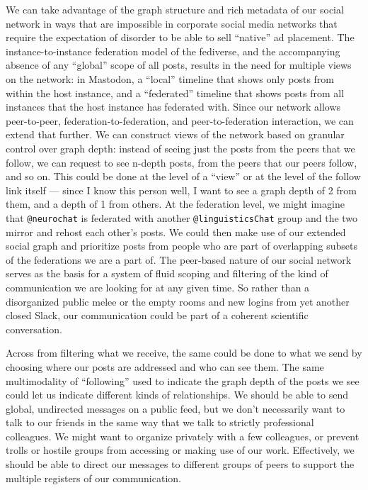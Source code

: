 We can take advantage of the graph structure and rich metadata of our
social network in ways that are impossible in corporate social media
networks that require the expectation of disorder to be able to sell
``native'' ad placement. The instance-to-instance federation model of
the fediverse, and the accompanying absence of any ``global'' scope of
all posts, results in the need for multiple views on the network: in
Mastodon, a ``local'' timeline that shows only posts from within the
host instance, and a ``federated'' timeline that shows posts from all
instances that the host instance has federated with. Since our network
allows peer-to-peer, federation-to-federation, and peer-to-federation
interaction, we can extend that further. We can construct views of the
network based on granular control over graph depth: instead of seeing
just the posts from the peers that we follow, we can request to see
n-depth posts, from the peers that our peers follow, and so on. This
could be done at the level of a ``view'' or at the level of the follow
link itself --- since I know this person well, I want to see a graph
depth of 2 from them, and a depth of 1 from others. At the federation
level, we might imagine that \texttt{@neurochat} is federated with
another \texttt{@linguisticsChat} group and the two mirror and rehost
each other's posts. We could then make use of our extended social graph
and prioritize posts from people who are part of overlapping subsets of
the federations we are a part of. The peer-based nature of our social
network serves as the basis for a system of fluid scoping and filtering
of the kind of communication we are looking for at any given time. So
rather than a disorganized public melee or the empty rooms and new
logins from yet another closed Slack, our communication could be part of
a coherent scientific conversation.

Across from filtering what we receive, the same could be done to what we
send by choosing where our posts are addressed and who can see them. The
same multimodality of ``following'' used to indicate the graph depth of
the posts we see could let us indicate different kinds of relationships.
We should be able to send global, undirected messages on a public feed,
but we don't necessarily want to talk to our friends in the same way
that we talk to strictly professional colleagues. We might want to
organize privately with a few colleagues, or prevent trolls or hostile
groups from accessing or making use of our work. Effectively, we should
be able to direct our messages to different groups of peers to support
the multiple registers of our communication.

